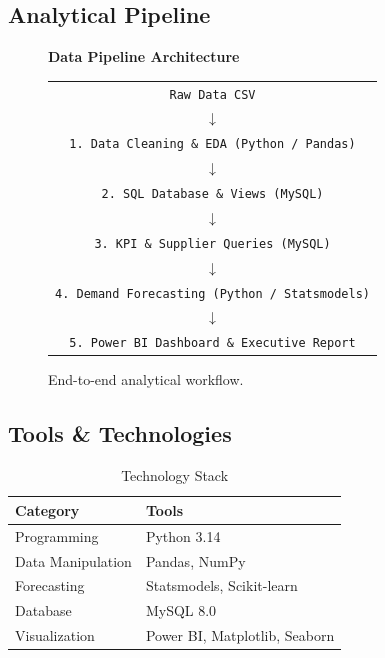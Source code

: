 \documentclass[11pt,a4paper]{article}
\begin{document}
\subsection{Analytical Pipeline}

\begin{figure}[H]
\centering
\begin{tcolorbox}[colback=lightgray, colframe=primaryblue, width=0.85\textwidth]
\centering
\textbf{Data Pipeline Architecture}\\[0.3cm]
\begin{tabular}{c}
\texttt{Raw Data CSV} \\
$\downarrow$ \\
\texttt{1. Data Cleaning \& EDA (Python / Pandas)} \\
$\downarrow$ \\
\texttt{2. SQL Database \& Views (MySQL)} \\
$\downarrow$ \\
\texttt{3. KPI \& Supplier Queries (MySQL)} \\
$\downarrow$ \\
\texttt{4. Demand Forecasting (Python / Statsmodels)} \\
$\downarrow$ \\
\texttt{5. Power BI Dashboard \& Executive Report}
\end{tabular}
\end{tcolorbox}
\caption{End-to-end analytical workflow.}
\label{fig:pipeline}
\end{figure}

\subsection{Tools \& Technologies}

\begin{table}[H]
\centering
\caption{Technology Stack}
\label{tab:tools}
\begin{tabular}{@{}ll@{}}
\toprule
\textbf{Category} & \textbf{Tools} \\
\midrule
Programming & Python 3.14 \\
Data Manipulation & Pandas, NumPy \\
Forecasting & Statsmodels, Scikit-learn \\
Database & MySQL 8.0 \\
Visualization & Power BI, Matplotlib, Seaborn \\
\bottomrule
\end{tabular}
\end{table}
\end{document}
